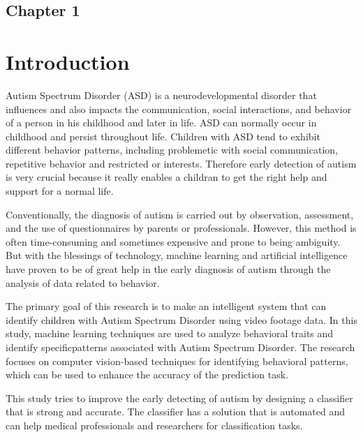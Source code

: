 \begin{center}
    \section*{\fontsize{20}{20}\selectfont Chapter 1}
\end{center}
\vspace{10mm}
\section{Introduction}
Autism Spectrum Disorder (ASD) is a neurodevelopmental disorder that influences and also impacts the communication, social interactions, and behavior of a person in his childhood and later in life. ASD can normally occur in childhood and persist throughout life. Children with ASD tend to exhibit different behavior patterns, including problemetic with social communication, repetitive behavior and restricted or interests. Therefore early detection of autism is very crucial because it really enables a childran to get the right help and support for a normal life\cite{okoye2023early}.

Conventionally, the diagnosis of autism is carried out by observation, assessment, and the use of questionnaires by parents or professionals. However, this method is often time-consuming and sometimes expensive and prone to being ambiguity. But with the blessings of technology, machine learning and artificial intelligence have proven to be of great help in the early diagnosis of autism through the analysis of data related to behavior\cite{perochon2023digital}.

The primary goal of this research is to make an intelligent system that can identify children with Autism Spectrum Disorder using video footage data. In this study, machine learning techniques are used to analyze behavioral traits and identify specificpatterns associated with Autism Spectrum Disorder. The research focuses on computer vision-based techniques for identifying behavioral patterns, which can be used to enhance the accuracy of the prediction task.

This study tries to improve the early detecting of autism by designing a classifier that is strong and accurate. The classifier has a solution that is automated and can help medical professionals and researchers for classification tasks.



